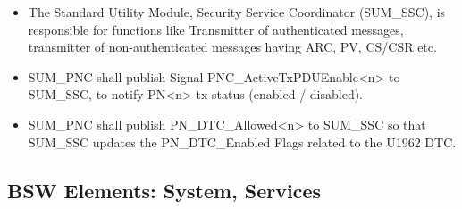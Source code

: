 \begin{itemize}
	\item The Standard Utility Module, Security Service Coordinator (SUM\_SSC), is responsible for functions like Transmitter of authenticated messages, transmitter of non-authenticated messages having ARC, PV, CS/CSR etc.
	\item SUM\_PNC shall publish Signal PNC\_ActiveTxPDUEnable<n> to SUM\_SSC, to notify PN<n> tx status (enabled / disabled).\\
    \item SUM\_PNC shall publish PN\_DTC\_Allowed<n> to SUM\_SSC so that SUM\_SSC updates the PN\_DTC\_Enabled Flags related to the U1962 DTC.
\end{itemize}

\subsection{BSW Elements: System, Services}
\\
